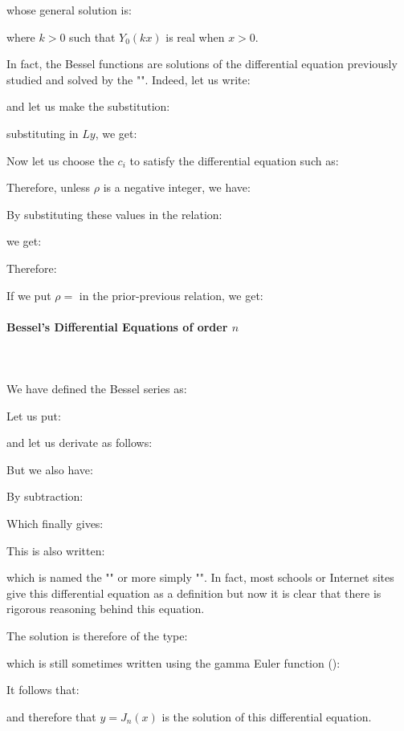 	whose general solution is:
	
	where $k>0$ such that $Y_0(kx)$ is real when $x>0$.
	
	In fact, the Bessel functions are solutions of the differential equation previously studied and solved by the "". Indeed, let us write:
	
	and let us make the substitution:
	
	substituting in $Ly$, we get:
	
	Now let us choose the $c_i$ to satisfy the differential equation such as:
	
	Therefore, unless $\rho$ is a negative integer, we have:
	
	By substituting these values in the relation:
	
	we get:
	
	Therefore:
	
	If we put $\rho=$ in the prior-previous relation, we get:
	
	
	\paragraph{Bessel's Differential Equations of order $n$}\mbox{}\\\\
	We have defined the Bessel series as:
	
	Let us put:
	
	and let us derivate as follows:
	
	But we also have:
	
	By subtraction:
	
	Which finally gives:
	
	This is also written:
	
	which is named the "" or more simply "". In fact, most schools or Internet sites give this differential equation as a definition but now it is clear that there is rigorous reasoning behind this equation.
	
	The solution is therefore of the type:
	
	which is still sometimes written using the gamma Euler function ():
	
	It follows that:
	
	and therefore that $y=J_n(x)$ is the solution of this differential equation.
	
